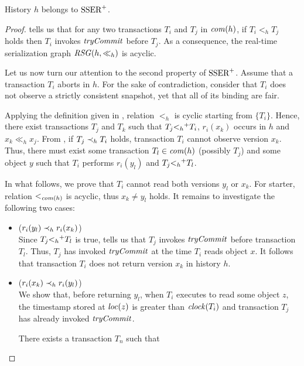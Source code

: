 \begin{theorem}
  History $h$ belongs to $\SPSER$.
\end{theorem}

\begin{proof}
   tells us that for any two transactions $T_i$ and $T_j$ in $\committed{h}$, if $T_i <_h T_j$ holds then $T_i$ invokes $\stmTryCommitFunction$ before $T_j$.
  As a consequence, the real-time serialization graph $\RSG(h,\ll_h)$ is acyclic.

  Let us now turn our attention to the second property of $\SPSER$.
  Assume that a transaction $T_i$ aborts in $h$.
  For the sake of contradiction, consider that $T_i$ does not observe a strictly consistent snapshot, yet that all of its binding are fair.
  
  Applying the definition given in , relation $<_h$ is cyclic starting from $\{T_i\}$.  
  Hence, there exist transactions $T_j$ and $T_k$ such that $T_j \closureOf{<_h} T_i$, $r_i(x_k)$ occurs in $h$ and $x_k \ll_h x_j$.
  From , if $T_j \hb_{h} T_i$ holds, transaction $T_i$ cannot observe version $x_k$.
  Thus, there must exist some transaction $T_l \in \committed{h}$ (possibly $T_j$) and some object $y$ such that $T_i$ performs $r_i(y_l)$ and $T_j \closureOf{<_h} T_l$.

  In what follows, we prove that $T_i$ cannot read both versions $y_l$ or $x_k$. 
  For starter, relation $<_{\committed{h}}$ is acyclic, thus $x_k \neq y_l$ holds.
  It remains to investigate the following two cases:
  \begin{itemize}
  \item ($r_i(y_l) \hb_h r_i(x_k)$)\\
    Since $T_j \closureOf{<_h} T_l$ is true,  tells us that $T_j$ invokes $\stmTryCommitFunction$ before transaction $T_l$.
    Thus, $T_j$ has invoked $\stmTryCommitFunction$ at the time $T_i$ reads object $x$.
    It follows that transaction $T_i$ does not return version $x_k$ in history $h$.
  \item ($r_i(x_k) \hb_h r_i(y_l)$)\\
    We show that, before returning $y_l$, when $T_i$ executes  to read some object $z$, the timestamp stored at $\locationOf{z}$ is greater than $\clockOf{T_i}$ and transaction $T_j$ has already invoked $\stmTryCommitFunction$.
    
    \begin{claim}
      There exists a transaction $T_n$ such that
    \end{claim}


\end{itemize}
\end{proof}
